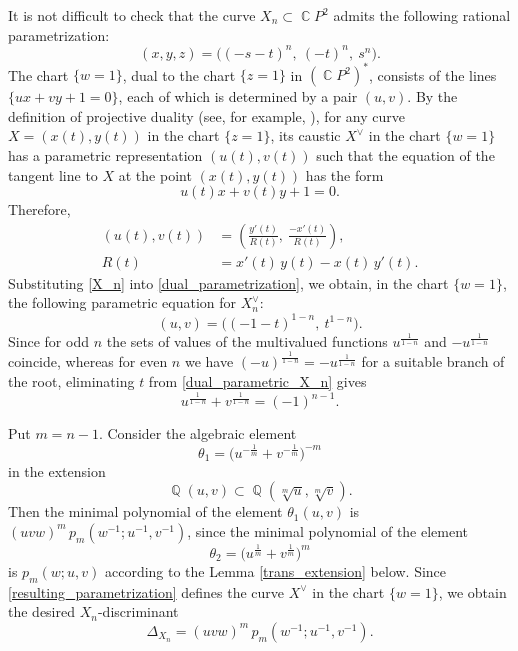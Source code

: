 \documentclass[14pt, dvipsnames]{extarticle}
\makeatletter
\theoremstyle{plain}
\theoremstyle{definition}
\theoremstyle{remark}
\renewenvironment{proof}[1][\proofname]{
  \par\pushQED{\qed}\normalfont
  \topsep6\p@\@plus6\p@\relax
  \trivlist\item[\hskip\labelsep\bfseries\itshape #1\@addpunct{.}]
}{\popQED\endtrivlist\@endpefalse}
\DeclareMathOperator{\Q}{\mathbb{Q}}
\DeclareMathOperator{\Cc}{\mathbb{C}}
\makeatother
\begin{document}
\begin{proof}
It is not difficult to check that the curve $X_n\subset \Cc\!P^2$ admits the following rational parametrization:
\begin{equation}\label{X_n}
(x,y,z)=\bigl((-s-t)^n,\ (-t)^n,\ s^n\bigr).
\end{equation}
The chart $\{w=1\}$, dual to the chart $\{z=1\}$ in $(\Cc\!P^2)^\ast$, consists of the lines $\{ux+vy+1=0\}$, each of which is determined by a pair $(u,v)$. By the definition of projective duality (see, for example, \cite[Chapter 1, Section 1, Subsection B]{Gelfand}), for any curve $X=(x(t),y(t))$ in the chart $\{z=1\}$, its caustic $X^\vee$ in the chart $\{w=1\}$ has a parametric representation $(u(t),v(t))$ such that the equation of the tangent line to $X$ at the point $(x(t),y(t))$ has the form
\begin{equation}\label{straight_line}
u(t)x+v(t)y+1=0.
\end{equation}
Therefore,
\begin{align}\label{dual_parametrization}
(u(t),v(t))&=\left(\frac{y'(t)}{R(t)},\ \frac{-x'(t)}{R(t)}\right),\\
R(t)&=x'(t)\,y(t)-x(t)\,y'(t).\nonumber
\end{align}
Substituting \eqref{X_n} into \eqref{dual_parametrization}, we obtain, in the chart $\{w=1\}$, the following parametric equation for $X_n^\vee$:
\begin{equation}\label{dual_parametric_X_n}
(u,v)=\bigl((-1-t)^{1-n},\ t^{1-n}\bigr).
\end{equation}
Since for odd $n$ the sets of values of the multivalued functions $u^{\frac{1}{1-n}}$ and $-u^{\frac{1}{1-n}}$ coincide, whereas for even $n$ we have $(-u)^{\frac{1}{1-n}}=-u^{\frac{1}{1-n}}$ for a suitable branch of the root, eliminating $t$ from \eqref{dual_parametric_X_n} gives
\begin{equation}\label{resulting_parametrization}
u^{\frac{1}{1-n}}+v^{\frac{1}{1-n}}=(-1)^{n-1}.
\end{equation}

Put $m=n-1$. Consider the algebraic element
$$\theta_1=\bigl(u^{-\frac{1}{m}}+v^{-\frac{1}{m}}\bigr)^{-m}$$
in the extension
\[
\Q(u,v)\subset \Q(\sqrt[m]{u},\sqrt[m]{v}).
\]
Then the minimal polynomial of the element $\theta_1(u,v)$ is $(uvw)^m\,p_m(w^{-1};u^{-1},v^{-1})$, since the minimal polynomial of the element
$$\theta_2=\bigl(u^{\frac{1}{m}}+v^{\frac{1}{m}}\bigr)^m$$
is $p_m(w;u,v)$ according to the Lemma \ref{trans_extension} below. Since \eqref{resulting_parametrization} defines the curve $X^\vee$ in the chart $\{w=1\}$, we obtain the desired $X_n$-discriminant
$$\Delta_{X_n}=(uvw)^m\,p_m(w^{-1};u^{-1},v^{-1}).$$
\end{proof}
\end{document}
